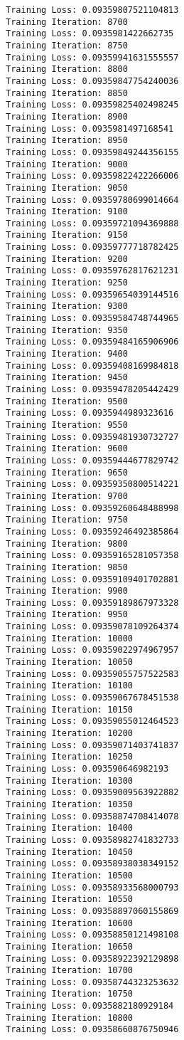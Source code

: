 \documentclass[11pt]{article}
\begin{document}
\begin{Verbatim}[commandchars=\\\{\}]
Training Loss: 0.09359807521104813
Training Iteration: 8700
Training Loss: 0.0935981422662735
Training Iteration: 8750
Training Loss: 0.09359941631555557
Training Iteration: 8800
Training Loss: 0.09359847754240036
Training Iteration: 8850
Training Loss: 0.09359825402498245
Training Iteration: 8900
Training Loss: 0.0935981497168541
Training Iteration: 8950
Training Loss: 0.09359849244356155
Training Iteration: 9000
Training Loss: 0.09359822422266006
Training Iteration: 9050
Training Loss: 0.09359780699014664
Training Iteration: 9100
Training Loss: 0.09359721094369888
Training Iteration: 9150
Training Loss: 0.09359777718782425
Training Iteration: 9200
Training Loss: 0.09359762817621231
Training Iteration: 9250
Training Loss: 0.09359654039144516
Training Iteration: 9300
Training Loss: 0.09359584748744965
Training Iteration: 9350
Training Loss: 0.09359484165906906
Training Iteration: 9400
Training Loss: 0.09359408169984818
Training Iteration: 9450
Training Loss: 0.09359478205442429
Training Iteration: 9500
Training Loss: 0.0935944989323616
Training Iteration: 9550
Training Loss: 0.09359481930732727
Training Iteration: 9600
Training Loss: 0.09359444677829742
Training Iteration: 9650
Training Loss: 0.09359350800514221
Training Iteration: 9700
Training Loss: 0.09359260648488998
Training Iteration: 9750
Training Loss: 0.09359246492385864
Training Iteration: 9800
Training Loss: 0.09359165281057358
Training Iteration: 9850
Training Loss: 0.09359109401702881
Training Iteration: 9900
Training Loss: 0.09359189867973328
Training Iteration: 9950
Training Loss: 0.09359078109264374
Training Iteration: 10000
Training Loss: 0.09359022974967957
Training Iteration: 10050
Training Loss: 0.09359055757522583
Training Iteration: 10100
Training Loss: 0.09359067678451538
Training Iteration: 10150
Training Loss: 0.09359055012464523
Training Iteration: 10200
Training Loss: 0.09359071403741837
Training Iteration: 10250
Training Loss: 0.093590646982193
Training Iteration: 10300
Training Loss: 0.09359009563922882
Training Iteration: 10350
Training Loss: 0.09358874708414078
Training Iteration: 10400
Training Loss: 0.09358982741832733
Training Iteration: 10450
Training Loss: 0.09358938038349152
Training Iteration: 10500
Training Loss: 0.09358933568000793
Training Iteration: 10550
Training Loss: 0.09358897060155869
Training Iteration: 10600
Training Loss: 0.09358850121498108
Training Iteration: 10650
Training Loss: 0.09358922392129898
Training Iteration: 10700
Training Loss: 0.09358744323253632
Training Iteration: 10750
Training Loss: 0.0935882180929184
Training Iteration: 10800
Training Loss: 0.09358660876750946

\end{Verbatim}
\end{document}
